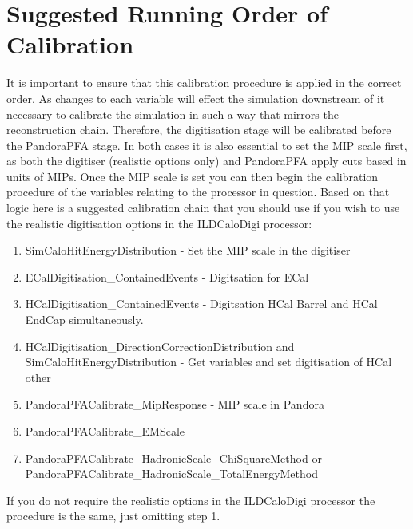 \documentclass[11pt, oneside]{article}   	%
\begin{document}

\section{Suggested Running Order of Calibration}

It is important to ensure that this calibration procedure is applied in the correct order.  As changes to each variable will effect the simulation downstream of it necessary to calibrate the simulation in such a way that mirrors the reconstruction chain.  Therefore, the digitisation stage will be calibrated before the PandoraPFA stage.  In both cases it is also essential to set the MIP scale first, as both the digitiser (realistic options only) and PandoraPFA apply cuts based in units of MIPs.  Once the MIP scale is set you can then begin the calibration procedure of the variables relating to the processor in question.  Based on that logic here is a suggested calibration chain that you should use if you wish to use the realistic digitisation options in the ILDCaloDigi processor:

\begin{enumerate}
\item SimCaloHitEnergyDistribution - Set the MIP scale in the digitiser
\item ECalDigitisation\_ContainedEvents - Digitsation for ECal
\item HCalDigitisation\_ContainedEvents - Digitsation HCal Barrel and HCal EndCap simultaneously.
\item HCalDigitisation\_DirectionCorrectionDistribution and SimCaloHitEnergyDistribution - Get variables and set digitisation of HCal other
\item PandoraPFACalibrate\_MipResponse - MIP scale in Pandora
\item PandoraPFACalibrate\_EMScale
\item PandoraPFACalibrate\_HadronicScale\_ChiSquareMethod or PandoraPFACalibrate\_HadronicScale\_TotalEnergyMethod
\end{enumerate}

If you do not require the realistic options in the ILDCaloDigi processor the procedure is the same, just omitting step 1.
\end{document}
